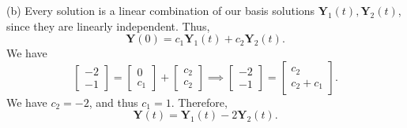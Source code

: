 \documentclass[11pt, letterpaper]{report}
\begin{document}
(b) Every solution is a linear combination of our basis solutions $\mathbf{Y}_1(t),\mathbf{Y}_2(t)$, since they are linearly independent. Thus,
\[
	\mathbf{Y}(0)=c_1 \mathbf{Y}_1(t)+c_2 \mathbf{Y}_2(t)
.\]
We have
\[
	\begin{bmatrix} -2 \\ -1 \end{bmatrix} =\begin{bmatrix} 0 \\ c_1 \end{bmatrix} +\begin{bmatrix} c_2 \\ c_2 \end{bmatrix} \implies \begin{bmatrix} -2 \\ -1 \end{bmatrix} =\begin{bmatrix} c_2 \\ c_2+c_1 \end{bmatrix} 
.\]
We have $c_2=-2$, and thus $c_1=1$. Therefore,
\[
	\mathbf{Y}(t)=\mathbf{Y}_1(t)-2\mathbf{Y}_2(t)
.\]
\end{document}
